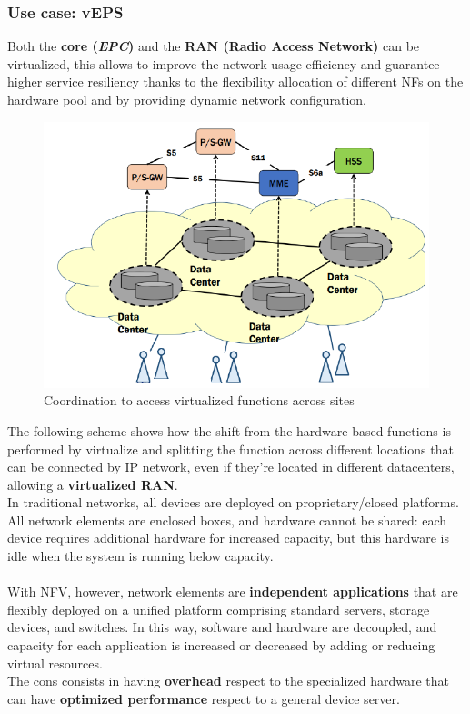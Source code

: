\documentclass[10pt,a4paper]{report}
\theoremstyle{definition}
\begin{document}
\subsubsection{Use case: vEPS}\label{sec:use-case-veps}
Both the \textbf{core (\textit{EPC})} and the \textbf{RAN (Radio Access Network)} can be virtualized, this allows to improve the network usage efficiency and guarantee higher service resiliency thanks to the flexibility allocation of different NFs on the hardware pool and by providing dynamic network configuration.
\begin{figure}
	\centering\includegraphics[scale=0.50]{images/Pasted image 20230405165048.png}
	\caption{Coordination to access virtualized functions across sites}
\end{figure}
The following scheme shows how the shift from the hardware-based functions is performed by virtualize and splitting the function across different locations that can be connected by IP network, even if they're located in different datacenters, allowing a \textbf{virtualized RAN}.\\
In traditional networks, all devices are deployed on proprietary/closed platforms. All network elements are enclosed boxes, and hardware cannot be shared: each device requires additional hardware for increased capacity, but this hardware is idle when the system is running below capacity.\\\\
With NFV, however, network elements are \textbf{independent applications} that are flexibly deployed on a unified platform comprising standard servers, storage devices, and switches. In this way, software and hardware are decoupled, and capacity for each application is increased or decreased by adding or reducing virtual resources.\\
The cons consists in having \textbf{overhead} respect to the specialized hardware that can have \textbf{optimized performance} respect to a general device server.
\end{document}

